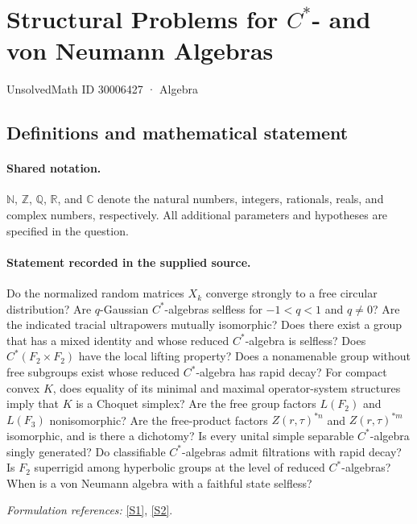 \documentclass[11pt]{article}
\newcommand{\sref}[2]{\hyperlink{source:#1:#2}{[S#2]}}
\begin{document}
\setcounter{section}{30006426}
\section{\texorpdfstring{Structural Problems for $C^*$- and von Neumann Algebras}{Structural Problems for C\textasciicircum{}*- and von Neumann Algebras}}\label{30006427}
{\small UnsolvedMath ID 30006427 · Algebra}
\subsection{Definitions and mathematical statement}

\paragraph{Shared notation.}$\mathbb N$, $\mathbb Z$, $\mathbb Q$, $\mathbb R$, and $\mathbb C$ denote the natural numbers, integers, rationals, reals, and complex numbers, respectively. All additional parameters and hypotheses are specified in the question.


\paragraph{Statement recorded in the supplied source.}
Do the normalized random matrices $X_k$ converge strongly to a free circular distribution? Are $q$-Gaussian $C^*$-algebras selfless for $-1<q<1$ and $q\neq0$? Are the indicated tracial ultrapowers mutually isomorphic? Does there exist a group that has a mixed identity and whose reduced $C^*$-algebra is selfless? Does $C^*(F_2\times F_2)$ have the local lifting property? Does a nonamenable group without free subgroups exist whose reduced $C^*$-algebra has rapid decay? For compact convex $K$, does equality of its minimal and maximal operator-system structures imply that $K$ is a Choquet simplex? Are the free group factors $L(F_2)$ and $L(F_3)$ nonisomorphic? Are the free-product factors $Z(r,\tau)^{*n}$ and $Z(r,\tau)^{*m}$ isomorphic, and is there a dichotomy? Is every unital simple separable $C^*$-algebra singly generated? Do classifiable $C^*$-algebras admit filtrations with rapid decay? Is $F_2$ superrigid among hyperbolic groups at the level of reduced $C^*$-algebras? When is a von Neumann algebra with a faithful state selfless?
\par\smallskip\textit{Formulation references:} \sref{30006427}{1}, \sref{30006427}{2}.
\end{document}
